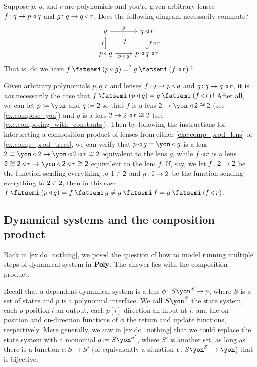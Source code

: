 \documentclass[Book-Poly]{subfiles}
\begin{document}
\begin{exercise}
Suppose $p$, $q$, and $r$ are polynomials and you're given arbitrary lenses $f\colon q\to p\mathbin{\triangleleft} q$ and $g\colon q\to q\mathbin{\triangleleft} r$. Does the following diagram necessarily commute?
\[
\begin{tikzcd}
	q\ar[r, "g"]\ar[d, "f"']&
	q\tri r\ar[d, "f\:\tri\:r"]\\
	p\tri q\ar[r, "p\:\tri\:g"']&
	p\tri q\tri r\ar[ul, phantom, "?"]
\end{tikzcd}
\]
That is, do we have $f\then (p\tri g)=^?g\then (f\tri r)$?
\begin{solution}
Given arbitrary polynomials $p,q,r$ and lenses $f\colon q\to p\mathbin{\triangleleft} q$ and $g\colon q\to q\mathbin{\triangleleft} r$, it is \emph{not} necessarily the case that $f\then (p\tri g)=g\then (f\tri r)$!
After all, we can let $p\coloneqq\yon$ and $q\coloneqq\textsf{2}$ so that $f$ is a lens $\2\to\yon\tri\2\iso\2$ (see \cref{ex.compose_yon}) and $g$ is a lens $\textsf{2}\to\textsf{2}\mathbin{\triangleleft} r\cong\textsf{2}$ (see \cref{exc.composing_with_constants}).
Then by following the instructions for interpreting a composition product of lenses from either \cref{exc.comp_prod_lens} or \cref{ex.comp_prod_trees}, we can verify that $p\tri g=\yon\tri g$ is a lens $\2\iso\yon\tri\2\to\yon\tri\2\tri r\iso\2$ equivalent to the lens $g$, while $f\mathbin{\triangleleft} r$ is a lens $\2\iso\2\tri r\to\yon\tri\2\tri r\iso\2$ equivalent to the lens $f$.
If, say, we let $f\colon\textsf{2}\to\textsf{2}$ be the function sending everything to $1\in\textsf{2}$ and $g\colon\textsf{2}\to\textsf{2}$ be the function sending everything to $2\in\textsf{2}$, then in this case $f\then (p\tri g)=f\then g\neq g\then f=g\then (f\tri r)$.
\end{solution}
\end{exercise}

\subsection{Dynamical systems and the composition product} \label{subsec.comon.comp.def.dyn_sys}

Back in \cref{ex.do_nothing}, we posed the question of how to model running multiple steps of dynamical system in $\mathbf{Poly}$.
The answer lies with the composition product.

Recall that a dependent dynamical system is a lens $\phi\colon S\yon^S\to p$, where $S$ is a set of states and $p$ is a polynomial interface.
We call $S\yon^S$ the state system, each $p$-position $i$ an output, each $p[i]$-direction an input at $i$, and the on-position and on-direction functions of $\phi$ the return and update functions, respectively.
More generally, we saw in \cref{ex.do_nothing} that we could replace the state system with a monomial $q\coloneqq S\yon^{S'}$, where $S'$ is another set, as long as there is a function $e\colon S\to S'$ (or equivalently a situation $\epsilon\colon S\yon^{S'}\to\yon$) that is bijective.
\end{document}
